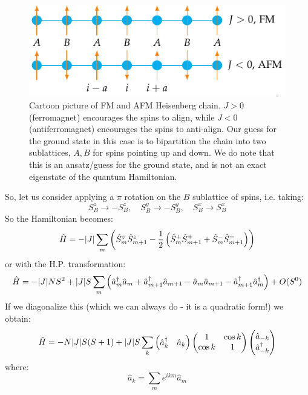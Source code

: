 \begin{figure}[htbp]
    \centering
    \includegraphics[scale=0.5]{Lectures/Figures/FMAFMHeisenbergchain.pdf}
    \caption{Cartoon picture of FM and AFM Heisenberg chain. $J > 0$ (ferromagnet) encourages the spins to align, while $J < 0$ (antiferromagnet) encourages the spins to anti-align. Our guess for the ground state in this case is to bipartition the chain into two sublattices, $A, B$ for spins pointing up and down. We do note that this is an ansatz/guess for the ground state, and is not an exact eigenstate of the quantum Hamiltonian.}
    \label{fig:FMAFMHeisenbergchain}
\end{figure}
So, let us consider applying a $\pi$ rotation on the $B$ sublattice of spins, i.e. taking:
\begin{equation}
    S^z_B \to -S^z_B, \quad S^y_B \to -S^y_B, \quad S^x_B \to S^x_B
\end{equation}
So the Hamiltonian becomes:
\begin{equation}\label{eq:AFMHeisenbergchain}
    \hat{H} = -\lvert J \rvert\sum_m\left(\hat{S}^z_m\hat{S}^z_{m+1} - \frac{1}{2}\left(\hat{S}^+_m\hat{S}^+_{m+1} + \hat{S}^-_m \hat{S}^-_{m+1}\right)\right)
\end{equation}
or with the H.P. transformation:
\begin{equation}\label{eq:AFMHeisenbergchainHP}
    \hat{H} = -\lvert J \rvert NS^2 + \lvert J \rvert S\sum_{m}\left(\hat{a}^\dagger_m\hat{a}_m + \hat{a}^\dagger_{m+1}\hat{a}_{m+1} - \hat{a}_m\hat{a}_{m+1} - \hat{a}^\dagger_{m+1}\hat{a}^\dagger_m\right) + O(S^0)
\end{equation}
If we diagonalize this (which we can always do - it is a quadratic form!) we obtain:
\begin{equation}
    \hat{H} = -N\lvert J \rvert S(S+1) + \lvert J \rvert S\sum_k \begin{pmatrix}\hat{a}^\dagger_k & \hat{a}_k\end{pmatrix}\begin{pmatrix}1 & \cos k \\ \cos k & 1\end{pmatrix} \begin{pmatrix}\hat{a}_{-k} \\ \hat{a}^\dagger_{-k}\end{pmatrix}
\end{equation}
where:
\begin{equation}
    \hat{a}_k = \sum_m e^{ikm}\hat{a}_m
\end{equation}
